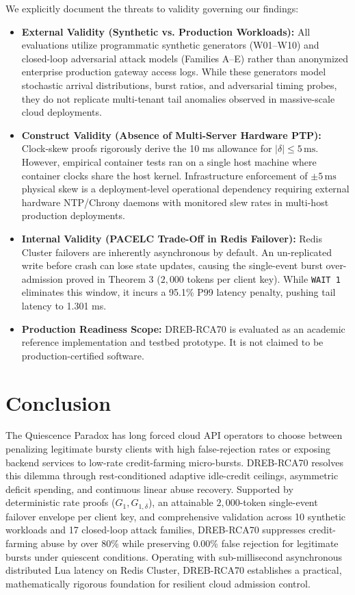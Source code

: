 \documentclass[conference]{IEEEtran}
\begin{document}
We explicitly document the threats to validity governing our findings:
\begin{itemize}
    \item \textbf{External Validity (Synthetic vs. Production Workloads):} All evaluations utilize programmatic synthetic generators (W01--W10) and closed-loop adversarial attack models (Families A--E) rather than anonymized enterprise production gateway access logs. While these generators model stochastic arrival distributions, burst ratios, and adversarial timing probes, they do not replicate multi-tenant tail anomalies observed in massive-scale cloud deployments.
    \item \textbf{Construct Validity (Absence of Multi-Server Hardware PTP):} Clock-skew proofs rigorously derive the 10 ms allowance for $|\delta| \le 5\,\text{ms}$. However, empirical container tests ran on a single host machine where container clocks share the host kernel. Infrastructure enforcement of $\pm 5\,\text{ms}$ physical skew is a deployment-level operational dependency requiring external hardware NTP/Chrony daemons with monitored slew rates in multi-host production deployments.
    \item \textbf{Internal Validity (PACELC Trade-Off in Redis Failover):} Redis Cluster failovers are inherently asynchronous by default. An un-replicated write before crash can lose state updates, causing the single-event burst over-admission proved in Theorem 3 ($2,000$ tokens per client key). While \texttt{WAIT 1} eliminates this window, it incurs a 95.1\% P99 latency penalty, pushing tail latency to 1.301 ms.
    \item \textbf{Production Readiness Scope:} DREB-RCA70 is evaluated as an academic reference implementation and testbed prototype. It is not claimed to be production-certified software.
\end{itemize}

\section{Conclusion}

The Quiescence Paradox has long forced cloud API operators to choose between penalizing legitimate bursty clients with high false-rejection rates or exposing backend services to low-rate credit-farming micro-bursts. DREB-RCA70 resolves this dilemma through rest-conditioned adaptive idle-credit ceilings, asymmetric deficit spending, and continuous linear abuse recovery. Supported by deterministic rate proofs ($G_1, G_{1,\delta}$), an attainable $2,000$-token single-event failover envelope per client key, and comprehensive validation across 10 synthetic workloads and 17 closed-loop attack families, DREB-RCA70 suppresses credit-farming abuse by over 80\% while preserving 0.00\% false rejection for legitimate bursts under quiescent conditions. Operating with sub-millisecond asynchronous distributed Lua latency on Redis Cluster, DREB-RCA70 establishes a practical, mathematically rigorous foundation for resilient cloud admission control.



\end{document}
